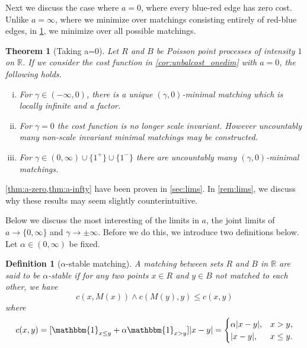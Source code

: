 \documentclass{article}
\newtheorem{theorem}{Theorem}[section]
\newtheorem{definition}{Definition}
\newcommand{\R}{\mathbb{R}}
\begin{document}
Next we discuss the case where $a=0$, where every blue-red
edge has zero cost. Unlike $a=\infty$, where we minimize over matchings
consisting entirely of red-blue edges, in \cref{thm:a-zero}, we minimize over all possible
matchings.

\begin{samepage}
\begin{theorem}[Taking a=0]\label{thm:a-zero}
 Let $R$ and $B$ be Poisson point processes of intensity $1$ on $\R$.
 If we consider the cost function in \cref{cor:unbalcost_onedim} with
 $a=0$, the following holds.
 \begin{enumerate}[(i)]
     \item For $\gamma\in(-\infty,0)$, there is a unique $(\gamma,0)$-minimal matching which is locally   infinite and a factor.
\item For $\gamma=0$ the cost function is no longer scale invariant.
 However uncountably many non-scale invariant minimal matchings may be constructed.
 \item For $\gamma\in(0,\infty)\cup\{1^+\}\cup\{1^-\}$
 there are uncountably many $(\gamma,0)$-minimal matchings.
 \end{enumerate}
\end{theorem}
\end{samepage}

\cref{thm:a-zero,thm:a-infty} have been proven in \cref{sec:lims}. In
\cref{rem:lims}, we discuss why these results may seem slightly
counterintuitive.


Below we discuss the most interesting of the limits in $a$, the joint
limits of $a\rightarrow\{0,\infty\}$ and
$\gamma\rightarrow\pm\infty$. Before we do this, we introduce two
definitions below. Let $\alpha\in(0,\infty)$ be fixed.

\begin{definition}[$\alpha$-stable matching]\label{def:alphastab}
  A matching between sets $R$ and $B$ in $\R$ are said to be
  $\alpha$-stable if for any two points $x\in R$ and $y\in B$ not
  matched to each other, we have
  \[
    c(x,M(x)) \wedge c(M(y),y) \leq c(x,y)
  \] where
  \begin{equation}
    c(x,y) = [\mathbbm{1}_{x\leq
  y}+\alpha\mathbbm{1}_{x>y}]|x-y| = \begin{cases} \alpha|x-y|, &
                                                                  x>y, \\ |x-y|, & x\leq y.\end{cases}
  \end{equation}
\end{definition}
\end{document}
